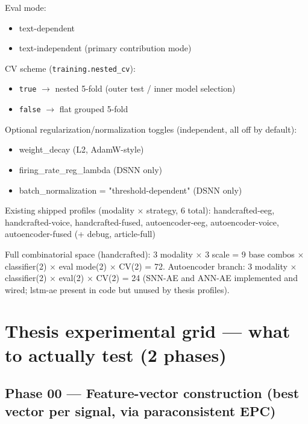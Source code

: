 Eval mode:
\begin{itemize}
    \item text-dependent
    \item text-independent (primary contribution mode)
\end{itemize}

CV scheme (\texttt{training.nested\_cv}):
\begin{itemize}
    \item \texttt{true} $\to$ nested 5-fold (outer test / inner model selection)
    \item \texttt{false} $\to$ flat grouped 5-fold
\end{itemize}

Optional regularization/normalization toggles (independent, all off by default):
\begin{itemize}
    \item weight\_decay (L2, AdamW-style)
    \item firing\_rate\_reg\_lambda (DSNN only)
    \item batch\_normalization = "threshold-dependent" (DSNN only)
\end{itemize}

Existing shipped profiles (modality $\times$ strategy, 6 total):
handcrafted-eeg, handcrafted-voice, handcrafted-fused, autoencoder-eeg, autoencoder-voice, autoencoder-fused (+ debug, article-full)

Full combinatorial space (handcrafted): 3 modality $\times$ 3 scale = 9 base combos $\times$ classifier(2) $\times$ eval mode(2) $\times$ CV(2) = 72.
Autoencoder branch: 3 modality $\times$ classifier(2) $\times$ eval(2) $\times$ CV(2) = 24 (SNN-AE and ANN-AE implemented and wired; lstm-ae present in code but unused by thesis profiles).

\section*{Thesis experimental grid --- what to actually test (2 phases)}

\subsection*{Phase 00 --- Feature-vector construction (best vector per signal, via paraconsistent EPC)}

